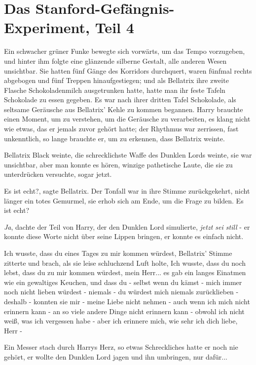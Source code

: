 \chapter{Das Stanford-Gefängnis-Experiment, Teil 4}

Ein schwacher grüner Funke bewegte sich vorwärts, um das Tempo vorzugeben, und
hinter ihm folgte eine glänzende silberne Gestalt, alle anderen Wesen
unsichtbar. Sie hatten fünf Gänge des Korridors durchquert, waren fünfmal rechts
abgebogen und fünf Treppen hinaufgestiegen; und als Bellatrix ihre zweite
Flasche Schokoladenmilch ausgetrunken hatte, hatte man ihr feste Tafeln
Schokolade zu essen gegeben. Es war nach ihrer dritten Tafel Schokolade, als
seltsame Geräusche aus Bellatrix' Kehle zu kommen begannen. Harry brauchte einen
Moment, um zu verstehen, um die Geräusche zu verarbeiten, es klang nicht wie
etwas, das er jemals zuvor gehört hatte; der Rhythmus war zerrissen, fast
unkenntlich, so lange brauchte er, um zu erkennen, dass Bellatrix weinte.

Bellatrix Black weinte, die schrecklichste Waffe des Dunklen Lords weinte, sie
war unsichtbar, aber man konnte es hören, winzige pathetische Laute, die sie zu
unterdrücken versuchte, sogar jetzt.

\glqq{}Es ist echt?\grqq{}, sagte Bellatrix. Der Tonfall war in ihre Stimme
zurückgekehrt, nicht länger ein totes Gemurmel, sie erhob sich am Ende, um die
Frage zu bilden. \glqq{}Es ist echt?\grqq{}

\emph{Ja}, dachte der Teil von Harry, der den Dunklen Lord simulierte,
\emph{jetzt sei still} - er konnte diese Worte nicht über seine Lippen bringen,
er konnte es einfach nicht.

\glqq{}Ich wusste, dass du eines Tages zu mir kommen würdest\grqq{}, Bellatrix'
Stimme zitterte und brach, als sie leise schluchzend Luft holte, \glqq{}Ich
wusste, dass du noch lebst, dass du zu mir kommen würdest, mein Herr... \glqq{}es
gab ein langes Einatmen wie ein gewaltiges Keuchen, \glqq{}und dass du - selbst
wenn du kämst - mich immer noch nicht lieben würdest - niemals - du würdest mich
niemals zurücklieben - deshalb - konnten sie mir - meine Liebe nicht nehmen -
auch wenn ich mich nicht erinnern kann - an so viele andere Dinge nicht erinnern
kann - obwohl ich nicht weiß, was ich vergessen habe - aber ich erinnere mich,
wie sehr ich dich liebe, Herr -\grqq{}

Ein Messer stach durch Harrys Herz, so etwas Schreckliches hatte er noch nie
gehört, er wollte den Dunklen Lord jagen und ihn umbringen, nur dafür...

